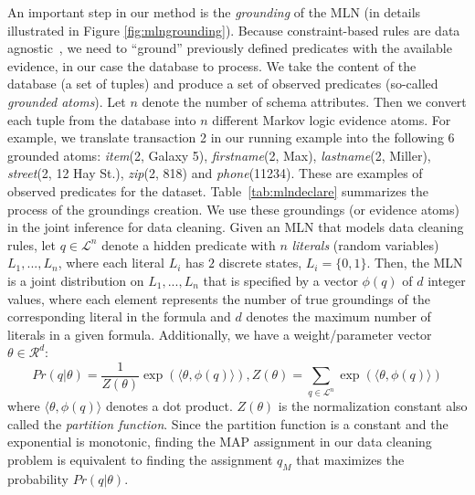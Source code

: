 An important step in our method is the \textit{grounding} of the MLN (in details illustrated in Figure \ref{fig:mlngrounding}). 
Because constraint-based rules are data agnostic~\cite{fan2012foundations}, we need to ``ground'' previously defined predicates with the available evidence, in our case the database to process. We take the content of the database (a set of tuples) and produce a set of observed predicates (so-called \textit{grounded atoms}). Let $n$ denote the number of schema attributes. Then we convert each tuple from the database into $n$ different Markov logic evidence atoms. For example, we translate transaction 2 in our running example into the following 6 grounded atoms: \textsl{item}(2, Galaxy 5), \textsl{firstname}(2, Max), \textsl{lastname}(2, Miller), \textsl{street}(2, 12 Hay St.), \textsl{zip}(2, 818) and \textsl{phone}(11234). These are examples of observed predicates for the dataset. Table~\ref{tab:mlndeclare} summarizes the process of the groundings creation. We use these groundings (or evidence atoms) in the joint inference for data cleaning. 
Given an MLN that models data cleaning rules, let $q \in \mathcal{L}^n$ denote a hidden predicate with $n$ \emph{literals} (random variables) $L_1,...,L_n$, where each literal $L_i$
has $2$ discrete states, $L_i = \lbrace 0,1 \rbrace$.
Then, the MLN is a joint distribution on  $L_1,...,L_n$ that 
is specified by a vector $\phi(q)$ of $d$ integer values, where
each element represents the number of true groundings of the 
corresponding literal in the formula and $d$ denotes the 
maximum number of literals in a given formula. Additionally, 
we have a weight/parameter vector $\theta \in \mathcal{R}^d$:
\begin{equation*}
Pr \left( q | \theta \right) = 
\frac{1}{Z(\theta)} \exp\left( \langle \theta, \phi(q) \rangle  \right), 
Z(\theta) = \sum_{q \in \mathcal{L}^n}\exp\left( \langle \theta, \phi(q) \rangle  \right) 
\end{equation*}
where $\langle \theta, \phi(q) \rangle$ denotes a dot product. 
$Z(\theta)$ is the normalization constant also called the 
\emph{partition function}. Since the partition function is a constant and the exponential is monotonic, finding the MAP assignment in our data cleaning problem is equivalent to finding the assignment $q_M$ that maximizes the probability $Pr \left( q | \theta \right)$.


